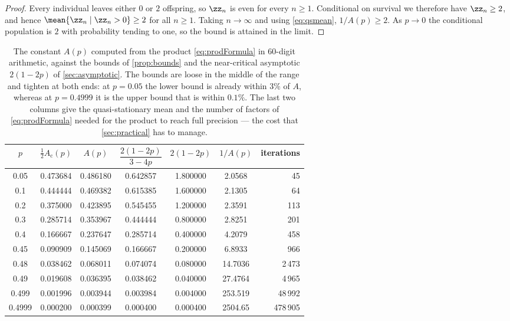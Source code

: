 \begin{proof}
Every individual leaves either $0$ or $2$ offspring, so $\zz_n$ is even for every
$n\ge1$. Conditional on survival we therefore have $\zz_n\ge2$, and hence
$\mean{\zz_n\mid \zz_n>0}\ge2$ for all $n\ge1$. Taking $n\to\infty$ and using
\cref{eq:qsmean}, $1/A(p)\ge2$. As $p\to0$ the conditional population is $2$ with
probability tending to one, so the bound is attained in the limit.
\end{proof}

\begin{table}[ht]
\centering
\caption{The constant $A(p)$ computed from the product \cref{eq:prodFormula} in
$60$-digit arithmetic, against the bounds of \cref{prop:bounds} and the near-critical
asymptotic $2(1-2p)$ of \cref{sec:asymptotic}. The bounds are loose in the middle of
the range and tighten at both ends: at $p=0.05$ the lower bound is already within
$3\%$ of $A$, whereas at $p=0.4999$ it is the upper bound that is within $0.1\%$.
The last two columns give the quasi-stationary mean and the number of factors of
\cref{eq:prodFormula} needed for the product to reach full precision --- the cost
that \cref{sec:practical} has to manage.}
\label{tab:Avals}
\begin{tabular}{ccccccr}
\toprule
$p$ & $\tfrac12 A_{\text{c}}(p)$ & $A(p)$ & $\dfrac{2(1-2p)}{3-4p}$ & $2(1-2p)$ & $1/A(p)$ & iterations\\
\midrule
0.05   & 0.473684 & 0.486180 & 0.642857 & 1.800000 & 2.0568 & 45 \\
0.1    & 0.444444 & 0.469382 & 0.615385 & 1.600000 & 2.1305 & 64 \\
0.2    & 0.375000 & 0.423895 & 0.545455 & 1.200000 & 2.3591 & 113 \\
0.3    & 0.285714 & 0.353967 & 0.444444 & 0.800000 & 2.8251 & 201 \\
0.4    & 0.166667 & 0.237647 & 0.285714 & 0.400000 & 4.2079 & 458 \\
0.45   & 0.090909 & 0.145069 & 0.166667 & 0.200000 & 6.8933 & 966 \\
0.48   & 0.038462 & 0.068011 & 0.074074 & 0.080000 & 14.7036 & 2\,473 \\
0.49   & 0.019608 & 0.036395 & 0.038462 & 0.040000 & 27.4764 & 4\,965 \\
0.499  & 0.001996 & 0.003944 & 0.003984 & 0.004000 & 253.519 & 48\,992 \\
0.4999 & 0.000200 & 0.000399 & 0.000400 & 0.000400 & 2504.65 & 478\,905 \\
\bottomrule
\end{tabular}
\end{table}

